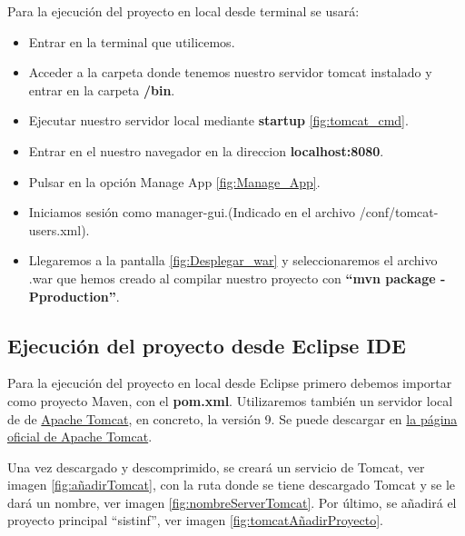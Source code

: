 Para la ejecución del proyecto en local desde terminal se usará:
\begin{itemize}
	\item Entrar en la terminal que utilicemos.
	\item Acceder a la carpeta donde tenemos nuestro servidor tomcat instalado y entrar en la carpeta \textbf{/bin}.
	\item Ejecutar nuestro servidor local mediante \textbf{startup} \ref{fig:tomcat_cmd}.  
	\item Entrar en el nuestro navegador en la direccion \textbf{localhost:8080}.
	\item Pulsar en la opción Manage App \ref{fig:Manage_App}.
	\item Iniciamos sesión como manager-gui.(Indicado en el archivo /conf/tomcat-users.xml).
	\item Llegaremos a la pantalla \ref{fig:Desplegar_war} y seleccionaremos el archivo .war que hemos creado al compilar nuestro proyecto con \textbf{``mvn package -Pproduction''}.
	
	
	
	
\end{itemize}

\subsection{Ejecución del proyecto desde Eclipse IDE}

Para la ejecución del proyecto en local desde Eclipse primero debemos importar como proyecto Maven, con el \textbf{pom.xml}. Utilizaremos también un servidor local de de \href{https://tomcat.apache.org/i}{Apache Tomcat}, en concreto, la versión 9. Se puede descargar en \href{https://tomcat.apache.org/download-90.cgi}{la página oficial de Apache Tomcat}.


Una vez descargado y descomprimido, se creará un servicio de Tomcat, ver imagen \ref{fig:añadirTomcat}, con la ruta donde se tiene descargado Tomcat y se le dará un nombre, ver imagen \ref{fig:nombreServerTomcat}. Por último, se añadirá el proyecto principal ``sistinf'', ver imagen \ref{fig:tomcatAñadirProyecto}.


